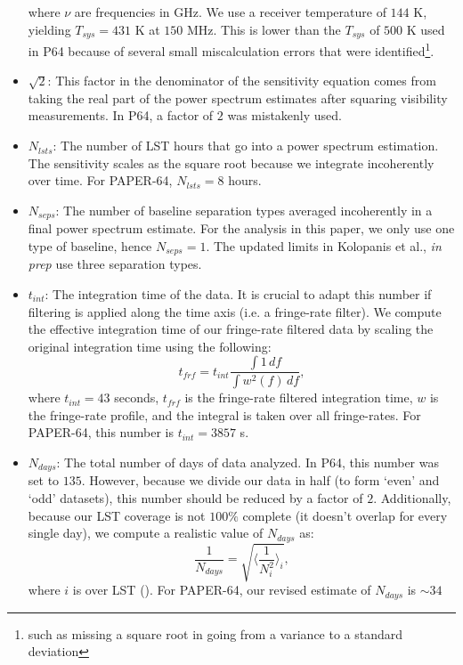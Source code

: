 \documentclass[preprint2,numberedappendix,tighten]{aastex6}  %
\begin{document}
\begin{itemize}
where $\nu$ are frequencies in GHz. We use a receiver temperature of $144$ K, yielding $T_{sys} = 431$ K at $150$ MHz. 
This is lower than the $T_{sys}$ of $500$ K used in P64 because of several small miscalculation errors that were 
identified\footnote{such as missing a square root in going from a variance to a standard deviation}.
\item $\sqrt{2}$: This factor in the denominator of the sensitivity equation comes from taking the real part of the power spectrum 
estimates after squaring visibility measurements. In P64, a factor of $2$ was mistakenly used.
\item $N_{lsts}$: The number of LST hours that go into a power spectrum estimation. The sensitivity scales as the square root 
because we integrate incoherently over time. For PAPER-64, $N_{lsts} = 8$ hours.
\item $N_{seps}$: The number of baseline separation types averaged incoherently in a final power spectrum estimate. For the 
analysis in this paper, we only use one type of baseline, hence $N_{seps}=1$. The updated limits in Kolopanis et al., \textit{in prep}
use three separation types.
\item $t_{int}$: The integration time of the data. It is crucial to adapt this number if filtering is applied along the time axis (i.e. a 
fringe-rate filter). We compute the effective integration time of our fringe-rate filtered data by scaling the original integration time 
using the following:
\begin{equation}
t_{frf} = t_{int} \frac{\int1 \, df}{\int w^{2}(f) \,df},
\end{equation}
where $t_{int}=43$ seconds, $t_{frf}$ is the fringe-rate filtered integration time, $w$ is the fringe-rate profile, and the integral is 
taken over all fringe-rates. For PAPER-64, this number is $t_{int} = 3857$ s. 
\item $N_{days}$: The total number of days of data analyzed. In P64, this number was set to $135$. However, because we 
divide our data in half (to form `even' and `odd' datasets), this number should be reduced by a factor of $2$. Additionally, 
because our LST coverage is not $100\%$ complete (it doesn't overlap for every single day), we compute a realistic value of 
$N_{days}$ as:
\begin{equation}
 \frac{1}{N_{days}} = \sqrt{\Big\langle\frac{1}{N_{i}^{2}} \Big\rangle_{i}},
 \end{equation}
\noindent where $i$ is over LST (\citealt{jacobs_et_al2015}). For PAPER-64, our revised estimate of $N_{days}$ is $\sim34$ 

\end{itemize}
\end{document}

